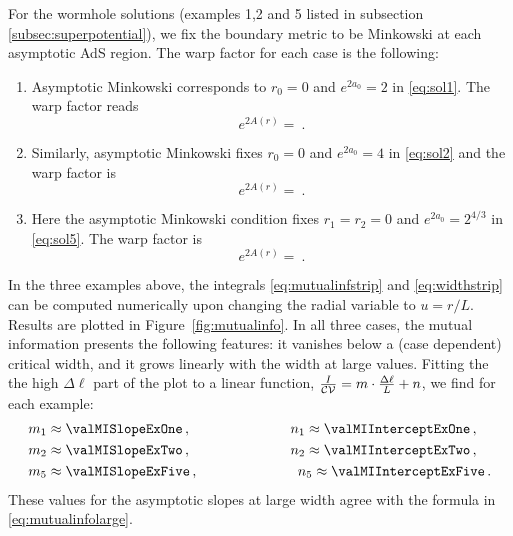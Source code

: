 For the wormhole solutions (examples 1,2 and 5 listed in subsection \ref{subsec:superpotential}), we fix the boundary metric to be Minkowski at each asymptotic AdS region. The warp factor for each case is the following:
\begin{enumerate}
\item 
Asymptotic Minkowski corresponds to $r_0=0$ and $e^{2a_0}=2$ in \eqref{eq:sol1}. The warp factor reads
\begin{equation}
	e^{2A(r)}=\ .
\end{equation}

\item 
Similarly, asymptotic Minkowski fixes $r_0=0$ and $e^{2a_0}=4$ in \eqref{eq:sol2} and the warp factor is
\begin{equation}
	e^{2A(r)}=\ .
\end{equation}

\item[5.] 
Here the asymptotic Minkowski condition fixes $r_1=r_2=0$ and $e^{2a_0}=2^{4/3}$ in \eqref{eq:sol5}. The warp factor is
\begin{equation}
	e^{2A(r)}=\ .
\end{equation}

\end{enumerate}
In the three examples above, the integrals \eqref{eq:mutualinfstrip} and \eqref{eq:widthstrip} can be computed numerically upon changing the radial variable to $u=r/L$. Results are plotted in Figure~\ref{fig:mutualinfo}.
In all three cases, the mutual information presents the following features: it vanishes below a (case dependent) critical width, and it grows linearly with the width at large values. Fitting the the high $\Delta\ell$ part of the plot to a linear function, $\frac{I}{\cal{C}V}=m\cdot \frac{\Delta \ell}{L} + n$, we find for each example:
\begin{align}
	m_1 &\approx \valMISlopeExOne\,, \hspace{2.5cm} n_1 \approx \valMIInterceptExOne\,, \\
	m_2 &\approx \valMISlopeExTwo\,, \hspace{2.5cm} n_2 \approx \valMIInterceptExTwo\,, \\
	m_5 &\approx \valMISlopeExFive\,, \hspace{2.5cm} n_5 \approx \valMIInterceptExFive\,.
\end{align}
These values for the asymptotic slopes at large width agree with the formula in \eqref{eq:mutualinfolarge}.

